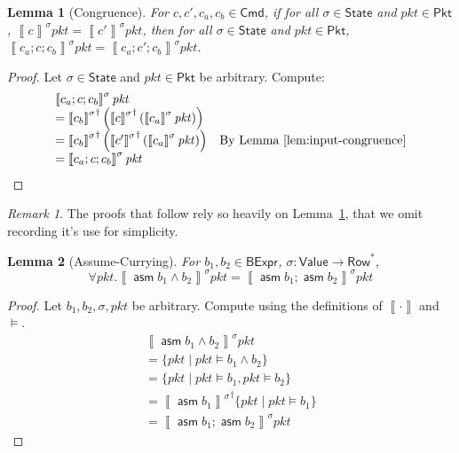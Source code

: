 \documentclass{article}
\newcommand{\pkt}{\mathit{pkt}}
\newcommand{\denote}[1]{\left\llbracket#1\right\rrbracket}
\newcommand{\Value}{\mathsf{Value}}
\newcommand{\BExpr}{\mathsf{BExpr}}
\newcommand{\Cmd}{\mathsf{Cmd}}
\newcommand{\Pkt}{\mathsf{Pkt}}
\newcommand{\Row}{\mathsf{Row}}
\newcommand{\State}{\mathsf{State}}
\newcommand{\assume}{\mathop{\mathsf{asm}}}
\theoremstyle{plain}
\newtheorem{lemma}{Lemma}
\theoremstyle{definition}
\theoremstyle{remark}
\newtheorem{remark}{Remark}
\begin{document}
\begin{lemma}[Congruence]
  \label{lem:congruence}
  For $c,c',c_a,c_b \in \Cmd$,
  if for all $\sigma \in \State$ and $\pkt \in \Pkt$, $\denote{c}^\sigma \pkt = \denote{c'}^\sigma \pkt$,
  then for all $\sigma \in \State$ and $\pkt \in \Pkt$, $\denote{c_a;c;c_b}^\sigma \pkt = \denote{c_a;c';c_b}^\sigma\pkt$.
\end{lemma}

\begin{proof}
  Let $\sigma \in \State$ and $\pkt \in \Pkt$ be arbitrary. Compute:
  \[\begin{array}{ll}
  \denote{c_a;c;c_b}^\sigma \pkt \\
  = {\denote{c_b}^\sigma}^\dagger\left({\denote{c}^\sigma}^\dagger\left(\denote{c_a}^\sigma \pkt\right)\right)\\
  = {\denote{c_b}^\sigma}^\dagger\left({\denote{c'}^\sigma}^\dagger\left(\denote{c_a}^\sigma \pkt\right)\right)
  & \text{By Lemma~\ref{lem:input-congruence}}\\
  =\denote{c_a;c;c_b}^\sigma \pkt \\
  \end{array}\]
\end{proof}

\begin{remark}
  The proofs that follow rely so heavily on Lemma~\ref{lem:congruence}, that we omit recording it's use for simplicity.
\end{remark}

\begin{lemma}[Assume-Currying]
  \label{lem:assume-currying}
  For $b_1,b_2 \in \BExpr$, $\sigma : \Value \to \Row^*$,
  \[\forall \pkt. \denote{\assume {b_1\wedge b_2}}^\sigma \pkt = \denote{\assume {b_1};\assume {b_2}}^\sigma \pkt\]
\end{lemma}
\begin{proof}
  Let $b_1,b_2,\sigma, \pkt$ be arbitrary. Compute using the definitions of $\denote\cdot$ and $\models$.
  \[\begin{array}{ll}
  \denote{\assume {b_1 \wedge b_2}}^\sigma \pkt \\
  = \{\pkt \mid \pkt \models b_1 \wedge b_2\} \\
  = \{\pkt \mid \pkt \models b_1, \pkt \models b_2\} \\
  = {\denote{\assume{b_1}}^\sigma}^\dagger\{\pkt \mid \pkt \models b_1\} \\
  = \denote{\assume{b_1}; \assume{b_2}}^\sigma \pkt
  \end{array}\]
\end{proof}
\end{document}
